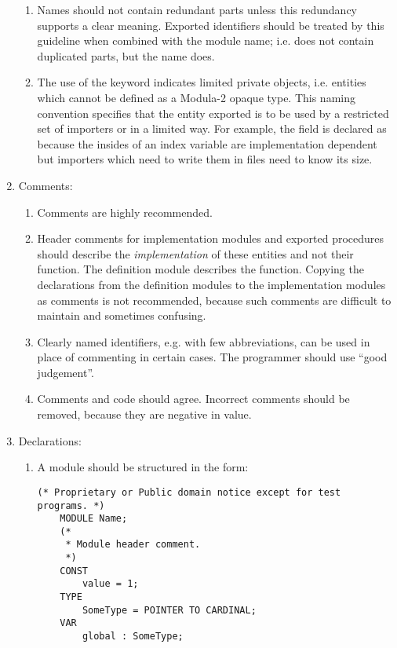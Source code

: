 \begin{enumerate}
\begin{enumerate}
    \item
        Names should not contain redundant parts unless this
        redundancy supports a clear meaning.  Exported identifiers should
        be treated by this guideline when combined with the module name; i.e.
         does not contain duplicated parts, but the
	name  does.
    \item
	The use of the keyword  indicates limited
	private objects, i.e. entities which cannot be defined as
	a Modula-2 opaque type.
	This naming convention specifies that the
	entity exported is to be used by a restricted set of importers
	or in a limited way.  For example, the 
	field is declared as  because the insides of an
	index variable are implementation dependent but importers
	which need to write them in files need to know its size.
    \end{enumerate}
\item
    Comments:
    \begin{enumerate}
    \item
        Comments are highly recommended.
    \item
        Header comments for implementation modules and  exported 
	procedures should describe 
        the {\em implementation} of these entities and not their function.   
	The definition
        module describes the function.  Copying the declarations from the 
	definition modules
        to the implementation modules as comments is not recommended, 
	because such comments
        are difficult to maintain and sometimes confusing.
    \item
        Clearly named identifiers, e.g. with few abbreviations, can 
	be used in place of
        commenting in certain cases.  The programmer should use ``good 
	judgement''.
    \item
        Comments and code should agree.  Incorrect comments should be 
	removed, because they are negative in value.
    \end{enumerate}
\item
    Declarations:
    \begin{enumerate}
    \item
        A module should be structured in the form:
        \begin{verbatim}
(* Proprietary or Public domain notice except for test programs. *)
    MODULE Name;
    (*
     * Module header comment.
     *)
    CONST
        value = 1;
    TYPE
        SomeType = POINTER TO CARDINAL;
    VAR
        global : SomeType;


\end{verbatim}
\end{enumerate}
\end{enumerate}
